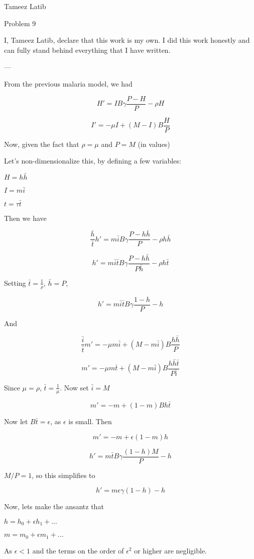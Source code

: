 \documentclass{article}
\begin{document}
Tameez Latib

Problem 9

I, Tameez Latib, declare that this work is my own. I did this work honestly and can fully stand behind everything that I have written.

---

From the previous malaria model, we had 

$$H' = IB \gamma \frac{P-H}{P} - \rho H$$

$$I' = - \mu I + (M-I)B \frac{H}{P}$$

Now, given the fact that $\rho = \mu$ and $P = M$ (in values)

Let's non-dimensionalize this, by defining a few variables:

$H = h\bar{h}$

$I = m\bar{i}$

$t = \tau\bar{t}$

Then we have

$$\frac{\bar{h}}{\bar{t}} h' = m\bar{i} B \gamma \frac{P-h\bar{h}}{P} - \rho h\bar{h}$$

$$ h' = m\bar{i}\bar{t} B \gamma \frac{P-h\bar{h}}{P \bar{h}} - \rho h\bar{t}$$

Setting $\bar{t} = \frac{1}{\rho}$, $\bar{h} = P$,  

$$ h' = m\bar{i}\bar{t} B \gamma \frac{1-h}{P} - h$$

And 

$$\frac{\bar{i}}{\bar{t}} m' = - \mu m\bar{i} + (M-m\bar{i})B \frac{h\bar{h}}{P}$$

$$ m' = - \mu m\bar{t} + (M-m\bar{i})B \frac{h\bar{h}\bar{t}}{P\bar{i}}$$

Since $\mu = \rho$, $\bar{t} = \frac{1}{\mu}$. Now set $\bar{i} = M$

 $$ m' = - m + (1-m)B{h\bar{t}}$$
 
 Now let $B \bar{t} = \epsilon$, as $\epsilon$ is small. Then
 
  $$ m' = - m + \epsilon (1-m)h$$
  
  $$ h' = m\bar{t} B \gamma \frac{(1-h)M}{P} - h$$
  
  $M/P = 1$, so this simplifies to 
  
  $$ h' = m \epsilon \gamma (1-h) - h$$
 
Now, lets make the ansantz that 

$h = h_0 + \epsilon h_1 + ... $

$m = m_0 + \epsilon m_1 + ... $

As $\epsilon < 1$ and the terms on the order of $\epsilon^2$ or higher are negligible. 
\end{document}

